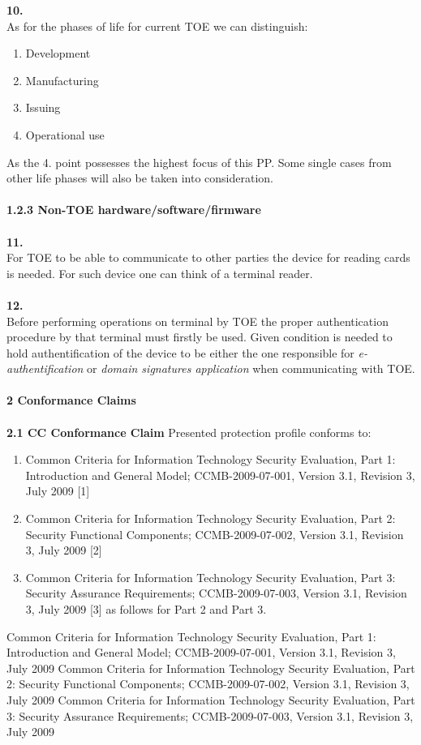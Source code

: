 \documentclass[a4paper, 11pt]{article}%
\begin{document}
\textbf{10.}\\
As for the phases of life for current TOE we can distinguish:
\begin{enumerate}
\item{Development}
\item{Manufacturing}
\item{Issuing}
\item{Operational use}
\end{enumerate}
As  the 4. point possesses the highest focus of this PP. Some single cases from other life phases will also be taken into consideration.\\\\
\textbf{\large{1.2.3 Non-TOE hardware/software/firmware}}\\\\
\textbf{11.}\\
For TOE to be able to communicate to other parties the device for reading cards is needed. For such device one can think of a terminal reader.\\\\ %
\textbf{12.}\\
Before performing operations on terminal by TOE the proper authentication procedure by that terminal must firstly be used. Given condition is needed to hold authentification of the device to be either the one responsible for \textit{e-authentification} or \textit{domain signatures application} when communicating with TOE.\\\\
\textbf{\Large{2 Conformance Claims}}\\\\
\textbf{\large{2.1 CC Conformance Claim}}
Presented protection profile conforms to:
\begin{enumerate}
\item{Common Criteria for Information Technology Security Evaluation, Part 1: Introduction and General Model; CCMB-2009-07-001, Version 3.1, Revision 3, July 2009 [1]}
\item{Common Criteria for Information Technology Security Evaluation, Part 2: Security Functional Components; CCMB-2009-07-002, Version 3.1, Revision 3, July 2009 [2]}
\item{Common Criteria for Information Technology Security Evaluation, Part 3: Security Assurance Requirements; CCMB-2009-07-003, Version 3.1, Revision 3, July 2009 [3]
as follows for Part 2 and Part 3.}
\end{enumerate}
\newpage
\begin{thebibliography}{3}
\bibitem{}Common Criteria for Information Technology Security Evaluation, Part 1: Introduction and General Model; CCMB-2009-07-001, Version 3.1, Revision 3, July 2009
\bibitem{}Common Criteria for Information Technology Security Evaluation, Part 2: Security Functional Components; CCMB-2009-07-002, Version 3.1, Revision 3, July 2009
\bibitem{}Common Criteria for Information Technology Security Evaluation, Part 3: Security Assurance Requirements; CCMB-2009-07-003, Version 3.1, Revision 3, July 2009
\end{thebibliography}
\end{document}
